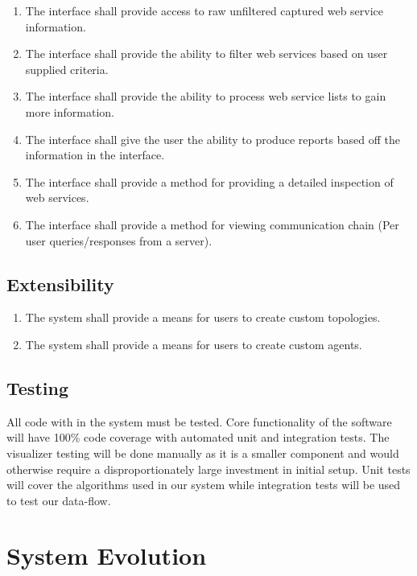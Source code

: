 \documentclass[titlepage]{article}
\begin{document}
\begin{enumerate}
    \item The interface shall provide access to raw unfiltered captured
        web service information.
    \item The interface shall provide the ability to filter web
        services based on user supplied criteria.
    \item The interface shall provide the ability to process web
        service lists to gain more information.
    \item The interface shall give the user the ability to produce
        reports based off the information in the interface.
    \item The interface shall provide a method for providing a
        detailed inspection of web services.
    \item The interface shall provide a method for viewing
        communication chain (Per user queries/responses from a server).
\end{enumerate}

\subsection{Extensibility%
  \label{extensibility}%
}
\begin{enumerate}
    \item The system shall provide a means for users to create custom topologies.
    \item The system shall provide a means for users to create custom agents.
\end{enumerate}

\subsection{Testing%
    \label{testing}%
}
All code with in the system must be tested. Core functionality of the software will have 100\% code coverage with automated unit and integration tests.  The visualizer testing will be done manually as it is a smaller component and would otherwise require a disproportionately large investment in initial setup.  Unit tests will cover the algorithms used in our system while integration tests will be used to test our data-flow.  

\section{System Evolution}
\end{document}
